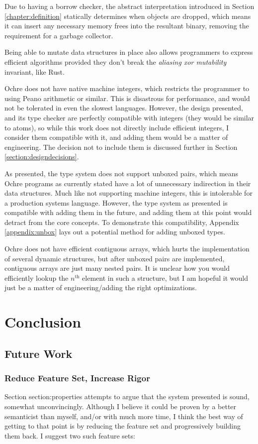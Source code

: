 \documentclass[12pt,twoside]{report}
\begin{document}
Due to having a borrow checker, the abstract interpretation introduced in Section \ref{chapter:definition} statically determines when objects are dropped, which means it can insert any necessary memory frees into the resultant binary, removing the requirement for a garbage collector.

Being able to mutate data structures in place also allows programmers to express efficient algorithms provided they don't break the \textit{aliasing xor mutability} invariant, like Rust.

Ochre does not have native machine integers, which restricts the programmer to using Peano arithmetic or similar. This is disastrous for performance, and would not be tolerated in even the slowest languages. However, the design presented, and its type checker are perfectly compatible with integers (they would be similar to atoms), so while this work does not directly include efficient integers, I consider them compatible with it, and adding them would be a matter of engineering. The decision not to include them is discussed further in Section \ref{section:designdecisions}.

As presented, the type system does not support unboxed pairs, which means Ochre programs as currently stated have a lot of unnecessary indirection in their data structures. Much like not supporting machine integers, this is intolerable for a production systems language. However, the type system as presented is compatible with adding them in the future, and adding them at this point would detract from the core concepts. To demonstrate this compatibility, Appendix \ref{appendix:unbox} lays out a potential method for adding unboxed types.

Ochre does not have efficient contiguous arrays, which hurts the implementation of several dynamic structures, but after unboxed pairs are implemented, contiguous arrays are just many nested pairs. It is unclear how you would efficiently lookup the $n^{\text{th}}$ element in such a structure, but I am hopeful it would just be a matter of engineering/adding the right optimizations.

\chapter{Conclusion}
\section{Future Work}
\subsection{Reduce Feature Set, Increase Rigor}
Section {section:properties} attempts to argue that the system presented is sound, somewhat unconvincingly. Although I believe it could be proven by a better semanticist than myself, and/or with much more time, I think the best way of getting to that point is by reducing the feature set and progressively building them back. I suggest two such feature sets:
\end{document}
